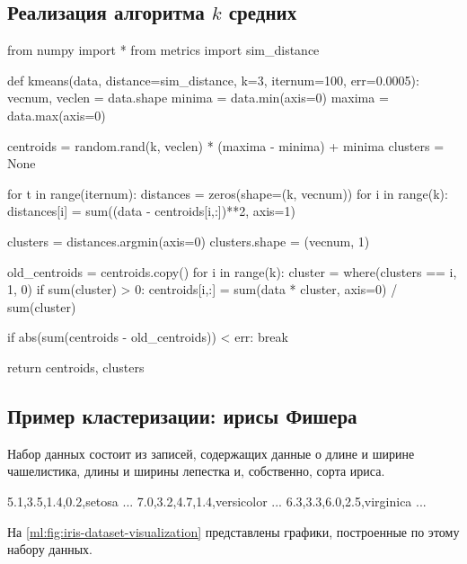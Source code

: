 \subsection{Реализация алгоритма $k$ средних}

\begin{pylst}{}{}
from numpy import *
from metrics import sim_distance

def kmeans(data, distance=sim_distance, k=3, iternum=100, err=0.0005):
    vecnum, veclen = data.shape
    minima = data.min(axis=0)
    maxima = data.max(axis=0)

    centroids = random.rand(k, veclen) * (maxima - minima) + minima
    clusters = None

    for t in range(iternum):
        distances = zeros(shape=(k, vecnum))
        for i in range(k):
            distances[i] = sum((data - centroids[i,:])**2, axis=1)

        clusters = distances.argmin(axis=0)
        clusters.shape = (vecnum, 1)

        old_centroids = centroids.copy()
        for i in range(k):
            cluster = where(clusters == i, 1, 0)
            if sum(cluster) > 0:
                centroids[i,:] = sum(data * cluster, axis=0) / sum(cluster)

        if abs(sum(centroids - old_centroids)) < err:
            break

    return centroids, clusters
\end{pylst}

\subsection{Пример кластеризации: ирисы Фишера}
Набор данных состоит из записей, содержащих данные о длине и ширине чашелистика, длины и ширины лепестка и, собственно, сорта ириса.
\begin{plainlst}{}{}
5.1,3.5,1.4,0.2,setosa
...
7.0,3.2,4.7,1.4,versicolor
...
6.3,3.3,6.0,2.5,virginica
...
\end{plainlst}

На \autoref{ml:fig:iris-dataset-visualization} представлены графики, построенные по этому набору данных.

